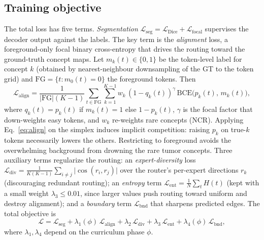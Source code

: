 \documentclass[runningheads]{llncs}
\begin{document}
\subsection{Training objective}\label{sec:loss}
The total loss has five terms. \emph{Segmentation}
$\mathcal{L}_{\text{seg}}=\mathcal{L}_{\text{Dice}}+\mathcal{L}_{\text{focal}}$ supervises
the decoder output against the labels. The key term is the \emph{alignment} loss, a
foreground-only focal binary cross-entropy that drives the routing toward the ground-truth
concept maps. Let $m_k(t)\in\{0,1\}$ be the token-level label for concept $k$ (obtained by
nearest-neighbour downsampling of the GT to the token grid) and
$\mathrm{FG}=\{t: m_0(t)=0\}$ the foreground tokens. Then
\begin{equation}
\mathcal{L}_{\text{align}}=\frac{1}{|\mathrm{FG}|(K-1)}\sum_{t\in\mathrm{FG}}\sum_{k=1}^{K-1}
w_k\,(1-q_{k}(t))^{\gamma}\,\mathrm{BCE}\big(p_k(t),\,m_k(t)\big),
\label{eq:align}
\end{equation}
where $q_k(t)=p_k(t)$ if $m_k(t)=1$ else $1-p_k(t)$, $\gamma$ is the focal factor that
down-weights easy tokens, and $w_k$ re-weights rare concepts (NCR). Applying
Eq.~\ref{eq:align} on the simplex induces implicit competition: raising $p_k$ on true-$k$
tokens necessarily lowers the others. Restricting to foreground avoids the overwhelming
background from drowning the rare tumor concepts. Three auxiliary terms regularize the
routing: an \emph{expert-diversity} loss
$\mathcal{L}_{\text{div}}=\frac{1}{K(K-1)}\sum_{i\neq j}\lvert\cos(r_i,r_j)\rvert$ over the
router's per-expert directions $r_k$ (discouraging redundant routing); an \emph{entropy}
term $\mathcal{L}_{\text{ent}}=\tfrac{1}{N}\sum_t H(t)$ (kept with a small weight
$\lambda_3\le0.01$, since larger values push routing toward uniform and destroy alignment);
and a \emph{boundary} term $\mathcal{L}_{\text{bnd}}$ that sharpens predicted edges. The
total objective is
\begin{equation}
\mathcal{L}=\mathcal{L}_{\text{seg}}
+\lambda_1(\phi)\,\mathcal{L}_{\text{align}}
+\lambda_2\,\mathcal{L}_{\text{div}}
+\lambda_3\,\mathcal{L}_{\text{ent}}
+\lambda_4(\phi)\,\mathcal{L}_{\text{bnd}},
\label{eq:total}
\end{equation}
where $\lambda_1,\lambda_4$ depend on the curriculum phase $\phi$.
\end{document}
